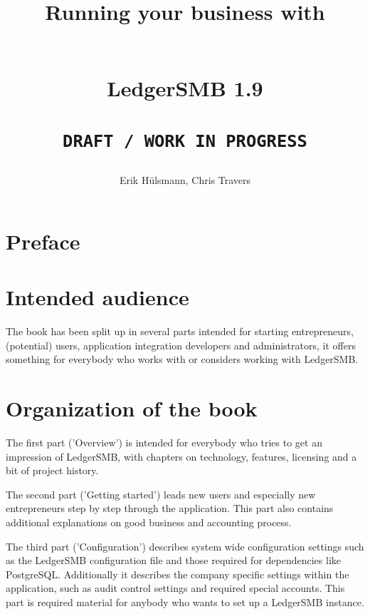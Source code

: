 \documentclass[10pt,a4paper]{book}
\begin{document}




\author{Erik H\"ulsmann, Chris Travers}
\title{\begin{Large}
Running your business with
\end{Large} \\
LedgerSMB 1.9 \\
 ~ \\
\texttt{DRAFT / WORK IN PROGRESS} }


\maketitle


\tableofcontents

\listoffigures

\listoftables

\printglossaries

\cleardoublepage

\section*{Preface}
\label{preface}

\section*{Intended audience}
\label{sec-intended-audience}

The book has been split up in several parts intended for starting entrepreneurs,
(potential) users, application integration developers and
administrators, it offers something for everybody who works with or considers working with
LedgerSMB.

\section*{Organization of the book}
\label{sec-book-organization}

The first
part ('Overview') is intended for everybody who tries to get an impression of LedgerSMB, with
chapters on technology, features, licensing and a bit of project history.

The second part
('Getting started') leads new users and especially new entrepreneurs step by step through the
application. This part also contains additional explanations on good business and accounting
process.

The third part ('Configuration') describes system wide configuration settings such as
the LedgerSMB configuration file and those required for dependencies like PostgreSQL. Additionally
it describes the company specific settings within the application, such as audit control settings
and required special accounts. This part is required material for anybody who wants to set up
a LedgerSMB instance.
\end{document}
